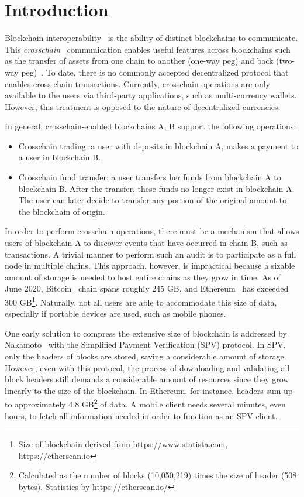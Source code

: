 \section{Introduction}

Blockchain interoperability~\cite{dionyziz} is the ability of distinct
blockchains to communicate.  This \emph{crosschain}~\cite{pow-sidechains,
pos-sidechains,burn,crosschain-sok, gtklocker} communication enables useful
features across blockchains such as the transfer of assets from one chain to
another (one-way peg) and back (two-way peg)~\cite{pow-sidechains}. To date,
there is no commonly accepted decentralized protocol that enables cross-chain
transactions. Currently, crosschain operations are only available to the users
via third-party applications, such as multi-currency wallets. However, this
treatment is opposed to the nature of decentralized currencies.

\noindent

In general, crosschain-enabled blockchains A, B support the following
operations:

\begin{itemize}
\item Crosschain trading: a user with deposits in blockchain A, makes a
    payment to a user in blockchain B.
\item Crosschain fund transfer: a user transfers her funds from blockchain
    A to blockchain B. After the transfer, these funds no longer exist in
    blockchain A. The user can later decide to transfer any portion of the
    original amount to the blockchain of origin.
\end{itemize}


\noindent

In order to perform crosschain operations, there must be a mechanism that
allows users of blockchain A to discover events that have occurred in chain B,
such as transactions. A trivial manner to perform such an audit is to
participate as a full node in multiple chains. This approach, however, is
impractical because a sizable amount of storage is needed to host entire
chains as they grow in time. As of June 2020, Bitcoin~\cite{nakamoto} chain
spans roughly 245 GB, and Ethereum~\cite{wood, buterin} has exceeded 300
GB\footnote{Size of blockchain derived from https://www.statista.com,
https://etherscan.io}. Naturally, not all users are
able to accommodate this size of data, especially if portable devices are used,
such as mobile phones.

One early solution to compress the extensive size of blockchain is addressed by
Nakamoto~\cite{nakamoto} with the Simplified Payment Verification (SPV)
protocol. In SPV, only the headers of blocks are stored, saving a considerable
amount of storage.  However, even with this protocol, the process of
downloading and validating all block headers still demands a considerable
amount of resources since they grow linearly to the size of the blockchain.
In Ethereum, for instance, headers sum up to approximately 4.8
GB\footnote{Calculated as the number of blocks (10,050,219) times the size of
header (508 bytes). Statistics by https://etherscan.io/} of data. A mobile
client needs several minutes, even hours, to fetch all information needed in
order to function as an SPV client.

